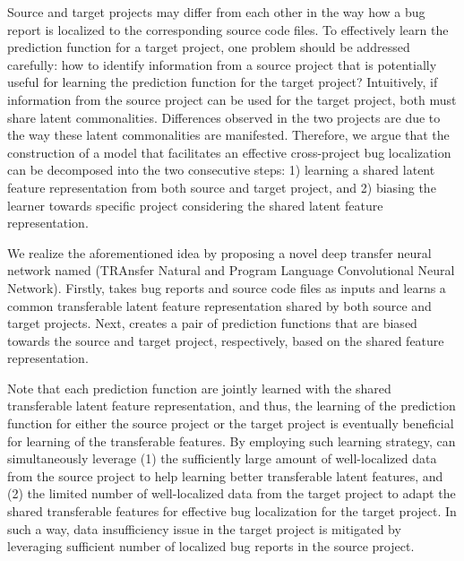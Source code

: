 Source and target projects may differ from each other in the way how a bug report is localized to the corresponding source code files. To effectively learn the prediction function for a target project, one problem should be addressed carefully: how to identify information from a source project that is potentially useful for learning the prediction function for the target project? Intuitively, if information from the source project can be used for the target project, both must share latent commonalities. Differences observed in the two projects are due to the way these latent commonalities are manifested. Therefore, we argue that the construction of a model that facilitates an effective cross-project bug localization can be decomposed into the two consecutive steps: 1) learning a shared latent feature representation from both source and target project, and 2) biasing the learner towards specific project considering the shared latent feature representation.   %

We realize the aforementioned idea by proposing a novel deep transfer neural network named \TRANPCNN (TRAnsfer Natural and Program Language Convolutional Neural Network). Firstly, \TRANPCNN takes bug reports and source code files as inputs and learns a common transferable latent feature representation shared by both source and target projects. Next, \TRANPCNN  creates a pair of prediction functions that are biased towards the source and target project, respectively, based on the shared feature representation. 

Note that each prediction function are jointly learned with the shared transferable latent feature representation, and thus, the learning of the prediction function for either the source project or the target project is eventually beneficial for learning of the transferable features.  By employing such learning strategy, \TRANPCNN can simultaneously leverage (1) the sufficiently large amount of well-localized data from the source project to help learning better transferable latent features, and (2) the limited number of well-localized data from the target project to adapt the shared transferable features for effective bug localization for the target project. In such a way,  data insufficiency issue in the target project is mitigated by leveraging sufficient number of localized bug reports in the source project.  %





